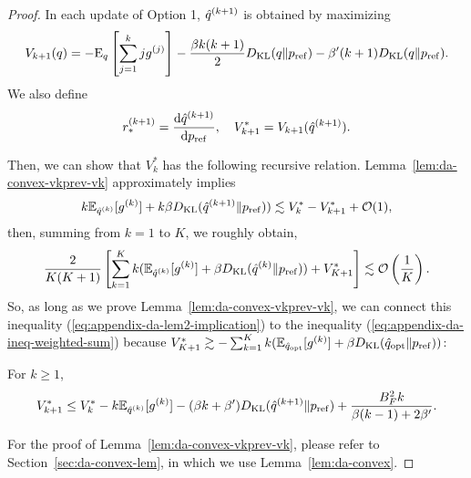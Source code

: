 \begin{proof}
  In each update of Option 1, $\hat{q}^{(k+1)}$ is obtained by maximizing 
  \begin{equation}
    V_{k+1}(q) = - \mathrm{E}_{q}\left[\sum_{j=1}^{k}j g^{(j)}\right] - \frac{\beta k (k+1)}{2}D_{\mathrm{KL}}(q\|p_{\rm{ref}})  
    - \beta' (k+1)D_{\mathrm{KL}}(q\|p_{\rm{ref}}). 
  \end{equation}
  We also define
  \begin{equation}
    r_{*}^{(k+1)} = \frac{\mathrm{d} \hat{q}^{(k+1)}}{\mathrm{d}p_{\rm{ref}}}, \quad V_{k+1}^*= V_{k+1}(\hat{q}^{(k+1)}).
   \end{equation}

  Then, we can show that $V^*_k$ has the following recursive relation.
  Lemma~\ref{lem:da-convex-vkprev-vk} approximately implies
  \begin{equation}
      k \mathbb{E}_{\hat{q}^{(k)}}[g^{(k)}] + k \beta D_{\mathrm{KL}}(\hat{q}^{(k+1)}\|p_{\rm{ref}})) \lesssim V_{k}^* - V_{k+1}^* + \mathcal{O}(1),
  \end{equation}
  then, summing from $k=1$ to $K$, we roughly obtain,
  \begin{equation}
      \frac{2}{K(K+1)}\left[ \sum_{k=1}^K k(\mathbb{E}_{\hat{q}^{(k)}}[g^{(k)}] + \beta D_{\mathrm{KL}}(\hat{q}^{(k)}\|p_{\rm{ref}})) + V_{K+1}^* \right]\lesssim \mathcal{O}\left(\frac{1}{K}\right).\label{eq:appendix-da-lem2-implication}
  \end{equation}
  So, as long as we prove Lemma~\ref{lem:da-convex-vkprev-vk}, we can connect this inequality (\ref{eq:appendix-da-lem2-implication}) to the inequality (\ref{eq:appendix-da-ineq-weighted-sum}) because $V_{K+1}^* \gtrsim -\sum_{k=1}^K k(\mathbb{E}_{\hat{q}_{\mathrm{opt}}}[g^{(k)}] + \beta D_{\mathrm{KL}}(\hat{q}_{\mathrm{opt}}\|p_{\rm{ref}}))$:
   
  \begin{lem}
    \label{lem:da-convex-vkprev-vk}
      For $k\geq 1$,
      \begin{equation}
        V_{k+1}^* \leq V_{k}^* - k\mathbb{E}_{\hat{q}^{(k)}}[g^{(k)}] - (\beta k+\beta')D_{\mathrm{KL}}(\hat{q}^{(k+1)}\|p_{\rm{ref}}) + \frac{B_F^2k}{\beta (k-1) + 2 \beta'}.\label{eq:da-convex-lem-2}
      \end{equation}
  \end{lem}
  For the proof of Lemma~\ref{lem:da-convex-vkprev-vk}, please refer to Section~\ref{sec:da-convex-lem}, in which we use Lemma~\ref{lem:da-convex}.



\end{proof}
